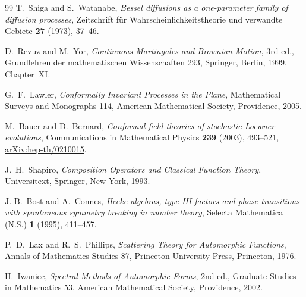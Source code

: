 \begin{thebibliography}{99}
T.~Shiga and S.~Watanabe, \emph{Bessel diffusions as a one-parameter family of
diffusion processes}, Zeitschrift f\"ur Wahrscheinlichkeitstheorie und
verwandte Gebiete \textbf{27} (1973), 37--46.

D.~Revuz and M.~Yor, \emph{Continuous Martingales and Brownian Motion},
3rd ed., Grundlehren der mathematischen Wissenschaften 293, Springer, Berlin,
1999, Chapter~XI.

G.~F.~Lawler, \emph{Conformally Invariant Processes in the Plane},
Mathematical Surveys and Monographs 114, American Mathematical Society,
Providence, 2005.

M.~Bauer and D.~Bernard, \emph{Conformal field theories of stochastic Loewner
evolutions}, Communications in Mathematical Physics \textbf{239} (2003),
493--521, \href{https://arxiv.org/abs/hep-th/0210015}{arXiv:hep-th/0210015}.

J.~H.~Shapiro, \emph{Composition Operators and Classical Function Theory},
Universitext, Springer, New York, 1993.

J.-B.~Bost and A.~Connes, \emph{Hecke algebras, type III factors and phase
transitions with spontaneous symmetry breaking in number theory}, Selecta
Mathematica (N.S.) \textbf{1} (1995), 411--457.

P.~D.~Lax and R.~S.~Phillips, \emph{Scattering Theory for Automorphic
Functions}, Annals of Mathematics Studies 87, Princeton University Press,
Princeton, 1976.

H.~Iwaniec, \emph{Spectral Methods of Automorphic Forms}, 2nd ed., Graduate
Studies in Mathematics 53, American Mathematical Society, Providence, 2002.
\end{thebibliography}
